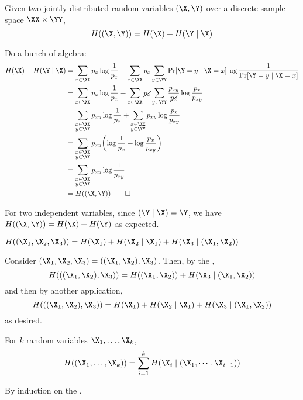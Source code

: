 \documentclass[class=co432,notes,tikz]{agony}
\begin{document}
\begin{theorem}\label{thm:chain}
  Given two jointly distributed random variables $(\X,\Y)$
  over a discrete sample space $\XX \times \YY$,
  \[ H((\X,\Y)) = H(\X) + H(\Y \mid \X) \]
\end{theorem}
\begin{prf}
  Do a bunch of algebra:
  \begin{align*}
    H(\X) + H(\Y\mid\X)
     & = \sum_{x\in\XX}p_x\log\frac{1}{p_x} + \sum_{x\in\XX}p_x \sum_{y\in\YY} \Pr[\Y=y\mid\X=x]\log\frac{1}{\Pr[\Y=y\mid\X=x]}           \\
     & = \sum_{x\in\XX}p_x\log\frac{1}{p_x} + \sum_{x\in\XX}\cancel{p_x} \sum_{y\in\YY} \frac{p_{xy}}{\cancel{p_x}}\log\frac{p_x}{p_{xy}} \\
     & = \sum_{\substack{x\in\XX\br y\in\YY}}p_{xy}\log\frac{1}{p_x} + \sum_{\substack{x\in\XX\br y\in\YY}} p_{xy}\log\frac{p_x}{p_{xy}}  \\
     & = \sum_{\substack{x\in\XX\br y\in\YY}}p_{xy}\qty(\log\frac{1}{p_x} + \log\frac{p_x}{p_{xy}})                                       \\
     & = \sum_{\substack{x\in\XX\br y\in\YY}}p_{xy}\log\frac{1}{p_{xy}}                                                                   \\
     & = H((\X,\Y)) \qedhere
  \end{align*}
\end{prf}
\begin{corollary}
  For two independent variables, since $(\Y \mid \X) = \Y$,
  we have $H((\X,\Y)) = H(\X) + H(\Y)$ as expected.
\end{corollary}
\begin{corollary}
  $H((\X_1,\X_2,\X_3)) = H(\X_1) + H(\X_2 \mid \X_1) + H(\X_3 \mid (\X_1,\X_2))$
\end{corollary}
\begin{prf}
  Consider $(\X_1,\X_2,\X_3) = ((\X_1,\X_2),\X_3)$.
  Then, by the ,
  \[ H(((\X_1,\X_2),\X_3)) = H((\X_1,\X_2)) + H(\X_3 \mid (\X_1,\X_2)) \]
  and then by another application,
  \[ H(((\X_1,\X_2),\X_3)) = H(\X_1) + H(\X_2 \mid \X_1) + H(\X_3 \mid (\X_1,\X_2)) \]
  as desired.
\end{prf}
\begin{theorem}
  For $k$ random variables $\X_1,\dotsc,\X_k$,
  \[ H((\X_1,\dotsc,\X_k)) = \sum_{i=1}^k H(\X_i \mid (\X_1,\cdots,\X_{i-1})) \]
\end{theorem}
\begin{prf}
  By induction on the .
\end{prf}
\end{document}
